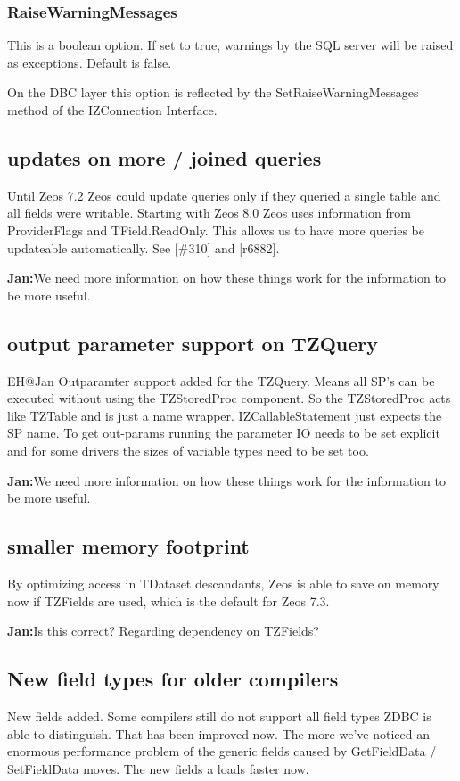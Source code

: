 \documentclass[a4paper,12pt,oneside]{article}
\begin{document}
\subsubsection{RaiseWarningMessages}
This is a boolean option.
If set to true, warnings by the SQL server will be raised as exceptions.
Default is false.

On the DBC layer this option is reflected by the SetRaiseWarningMessages method of the IZConnection Interface.

\subsection{updates on more / joined queries}
Until Zeos 7.2 Zeos could update queries only if they queried a single table and all fields were writable.
Starting with Zeos 8.0 Zeos uses information from ProviderFlags and TField.ReadOnly.
This allows us to have more queries be updateable automatically.
See [\#310] and [r6882].

\textbf{Jan:}We need more information on how these things work for the information to be more useful.

\subsection{output parameter support on TZQuery}
EH@Jan Outparamter support added for the TZQuery.
Means all SP's can be executed without using the TZStoredProc component.
So the TZStoredProc acts like TZTable and is just a name wrapper.
IZCallableStatement just expects the SP name.
To get out-params running the parameter IO needs to be set explicit and for some drivers the sizes of variable types need to be set too.

\textbf{Jan:}We need more information on how these things work for the information to be more useful.

\subsection{smaller memory footprint}
By optimizing access in TDataset descandants, Zeos is able to save on memory now if TZFields are used, which is the default for Zeos 7.3.

\textbf{Jan:}Is this correct? Regarding dependency on TZFields?

\subsection{New field types for older compilers}
New fields added.
Some compilers still do not support all field types ZDBC is able to distinguish.
That has been improved now.
The more we've noticed an enormous performance problem of the generic fields caused by GetFieldData / SetFieldData moves.
The new fields a loads faster now.
\end{document}
